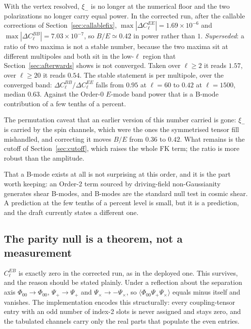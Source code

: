 With the vertex resolved, $\xi_-$ is no longer at the numerical floor and
the two polarizations no longer carry equal power. In the corrected run,
after the callable corrections of Section~\ref{sec:callablefix},
$\max|\Delta C_\ell^{EE}|=1.69\times10^{-6}$ and
$\max|\Delta C_\ell^{BB}|=7.03\times10^{-7}$, so $B/E\simeq0.42$ in power
rather than $1$. \emph{Superseded}: a ratio of two maxima is not a stable
number, because the two maxima sit at different multipoles and both sit in
the low-$\ell$ region that Section~\ref{sec:afterwards} shows is not
converged. Taken over $\ell\ge2$ it reads $1.57$, over $\ell\ge20$ it
reads $0.54$. The stable statement is per multipole, over the converged
band: $\Delta C_\ell^{BB}/\Delta C_\ell^{EE}$ falls from $0.95$ at
$\ell=60$ to $0.42$ at $\ell=1500$, median $0.63$. Against the Order-0 $E$-mode band power that is a B-mode
contribution of a few tenths of a percent.

The permutation caveat that an earlier version of this number carried is
gone: $\xi_-$ is carried by the spin channels, which were the ones the
symmetrised tensor fill mishandled, and correcting it moves $B/E$ from
$0.36$ to $0.42$. What remains is the cutoff of Section~\ref{sec:cutoff},
which raises the whole FK term; the ratio is more robust than the
amplitude.

That a B-mode exists at all is not surprising at this order, and it is the
part worth keeping: an Order-2 term sourced by driving-field
non-Gaussianity generates shear B-modes, and B-modes are the standard null
test in cosmic shear. A prediction at the few tenths of a percent level is
small, but it is a prediction, and the draft currently states a different
one.

\subsection{The parity null is a theorem, not a measurement}

$C_\ell^{EB}$ is exactly zero in the corrected run, as in the deployed one.
This survives, and the reason should be stated plainly. Under a reflection
about the separation axis $\Phi_{00}\to\Phi_{00}$, $\Psi_+\to\Psi_+$ and
$\Psi_\times\to-\Psi_\times$, so $\langle\Phi_{00}\Psi_+\Psi_\times\rangle$
equals minus itself and vanishes. The implementation encodes this
structurally: every coupling-tensor entry with an odd number of index-2
slots is never assigned and stays zero, and the tabulated channels carry
only the real parts that populate the even entries.

